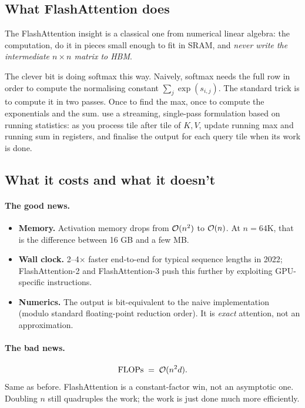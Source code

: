 \subsection{What FlashAttention does}

The FlashAttention insight is a classical one from numerical linear algebra:
 the computation, do it in pieces small enough to fit in SRAM,
and \emph{never write the intermediate \(n \times n\) matrix to HBM}.

The clever bit is doing softmax this way. Naively, softmax needs the full
row in order to compute the normalising constant
\(\sum_j \exp(s_{i,j})\). The standard trick is to compute it in two
passes. Once to find the max, once to compute the exponentials and the
sum. \citet{dao2022flashattention} use a streaming, single-pass formulation
based on running statistics: as you process tile after tile of \(K, V\),
update running max and running sum in registers, and finalise the output for
each query tile when its work is done.

\subsection{What it costs and what it doesn't}

\paragraph{The good news.}
\begin{itemize}
\item \textbf{Memory.} Activation memory drops from \(\mathcal{O}(n^2)\) to
\(\mathcal{O}(n)\). At \(n = 64\)K, that is the difference between 16 GB and a
few MB.
\item \textbf{Wall clock.} 2--4$\times$ faster end-to-end for typical
sequence lengths in 2022; FlashAttention-2 \citep{dao2023fa2} and
FlashAttention-3 \citep{shah2024fa3} push this further by exploiting
GPU-specific instructions.
\item \textbf{Numerics.} The output is bit-equivalent to the naive
implementation (modulo standard floating-point reduction order). It is
\emph{exact} attention, not an approximation.
\end{itemize}

\paragraph{The bad news.}
\begin{equation}
  \text{FLOPs} \;=\; \mathcal{O}(n^2 d).
\end{equation}
Same as before. FlashAttention is a constant-factor win, not an asymptotic
one. Doubling \(n\) still quadruples the work; the work is just done much
more efficiently.

